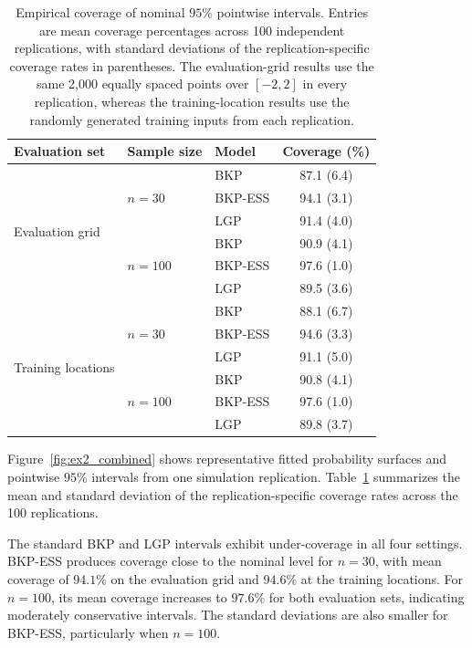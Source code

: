 \documentclass[article, shortnames]{jss}
\begin{document}
\begin{table}[!t]
	\centering
	\begin{tabular}{lllc}
		\toprule
		Evaluation set & Sample size & Model & Coverage (\%) \\
		\midrule
		\multirow{6}{*}{Evaluation grid}
		& \multirow{3}{*}{$n=30$}
		& BKP     & 87.1 (6.4) \\
		& & BKP-ESS & 94.1 (3.1) \\
		& & LGP     & 91.4 (4.0) \\
		\cmidrule{2-4}
		& \multirow{3}{*}{$n=100$}
		& BKP     & 90.9 (4.1) \\
		& & BKP-ESS & 97.6 (1.0) \\
		& & LGP     & 89.5 (3.6) \\
		\midrule
		\multirow{6}{*}{Training locations}
		& \multirow{3}{*}{$n=30$}
		& BKP     & 88.1 (6.7) \\
		& & BKP-ESS & 94.6 (3.3) \\
		& & LGP     & 91.1 (5.0) \\
		\cmidrule{2-4}
		& \multirow{3}{*}{$n=100$}
		& BKP     & 90.8 (4.1) \\
		& & BKP-ESS & 97.6 (1.0) \\
		& & LGP     & 89.8 (3.7) \\
		\bottomrule
	\end{tabular}
	\caption{Empirical coverage of nominal $95\%$ pointwise intervals. Entries are mean coverage percentages across 100 independent replications, with standard deviations of the replication-specific coverage rates in parentheses. The evaluation-grid results use the same 2,000 equally spaced points over $[-2,2]$ in every replication, whereas the training-location results use the randomly generated training inputs from each replication.}
	\label{tab:coverage_results}
\end{table}

Figure~\ref{fig:ex2_combined} shows representative fitted probability surfaces and pointwise $95\%$ intervals from one simulation replication. Table~\ref{tab:coverage_results} summarizes the mean and standard deviation of the replication-specific coverage rates across the 100 replications.

The standard BKP and LGP intervals exhibit under-coverage in all four settings. BKP-ESS produces coverage close to the nominal level for $n=30$, with mean coverage of $94.1\%$ on the evaluation grid and $94.6\%$ at the training locations. For $n=100$, its mean coverage increases to $97.6\%$ for both evaluation sets, indicating moderately conservative intervals. The standard deviations are also smaller for BKP-ESS, particularly when $n=100$.
\end{document}
